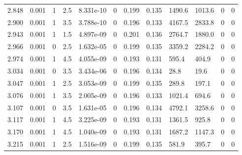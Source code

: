 \documentclass[preview]{standalone}
\begin{document}
{{{\begin{tabular}{L{1.2cm}C{1.2cm} C{0.3cm}C{0.5cm} C{1.4cm}C{1.4cm} C{1.4cm}C{1.4cm} C{1.6cm}C{1.6cm} C{1.6cm}C{1.6cm}}
  2.848  &  0.001  & 1     & 2.5 &  8.331e-10  & 0  &  0.199&   0.135& 1490.6 & 1013.6   &  0 & 0  \\ 
  2.900  &  0.001  & 1     & 3.5 &  3.788e-10  & 0  &  0.196&   0.133& 4167.5 & 2833.8   &  0 & 0  \\ 
  2.943  &  0.001  & 1     & 1.5 &  4.897e-09  & 0  &  0.201&   0.136& 2764.7 & 1880.0   &  0 & 0  \\ 
  2.966  &  0.001  & 0     & 2.5 &  1.632e-05  & 0  &  0.199&   0.135& 3359.2 & 2284.2   &  0 & 0  \\ 
  2.974  &  0.001  & 1     & 4.5 &  4.055e-09  & 0  &  0.193&   0.131& 595.4 & 404.9   &  0 & 0  \\ 
  3.034  &  0.001  & 0     & 3.5 &  3.434e-06  & 0  &  0.196&   0.134& 28.8 & 19.6   &  0 & 0  \\ 
  3.047  &  0.001  & 1     & 2.5 &  3.053e-09  & 0  &  0.199&   0.135& 289.8 & 197.1   &  0 & 0  \\ 
  3.076  &  0.001  & 1     & 3.5 &  2.005e-09  & 0  &  0.196&   0.133& 1021.4 & 694.6   &  0 & 0  \\ 
  3.107  &  0.001  & 0     & 3.5 &  1.631e-05  & 0  &  0.196&   0.134& 4792.1 & 3258.6   &  0 & 0  \\ 
  3.117  &  0.001  & 1     & 4.5 &  3.225e-09  & 0  &  0.193&   0.131& 1361.5 & 925.8   &  0 & 0  \\ 
  3.170  &  0.001  & 1     & 4.5 &  1.040e-09  & 0  &  0.193&   0.131& 1687.2 & 1147.3   &  0 & 0  \\ 
  3.215  &  0.001  & 1     & 2.5 &  1.516e-09  & 0  &  0.199&   0.135& 581.9 & 395.7   &  0 & 0  \\ 
\hline 
\end{tabular} 

}}}
\end{document}
